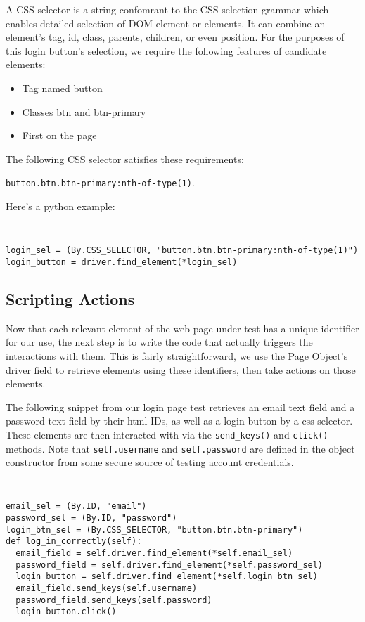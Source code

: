 A CSS selector is a string confomrant to the CSS selection grammar \citep{Selector54} which enables detailed selection of DOM element or elements. It can combine an element's tag, id, class, parents, children, or even position. For the purposes of this login button's selection, we require the following features of candidate elements:
\begin{itemize}
\item Tag named button
\item Classes btn and btn-primary
\item First on the page
\end{itemize}

The following CSS selector satisfies these requirements:

\texttt{button.btn.btn-primary:nth-of-type(1)}.

Here's a python example:
{\tt
\begin{verbatim}
login_sel = (By.CSS_SELECTOR, "button.btn.btn-primary:nth-of-type(1)")
login_button = driver.find_element(*login_sel)
\end{verbatim}
} \citep{gupta2003dom,DOMStand78, nicholus2016understanding}


\subsection{Scripting Actions}
Now that each relevant element of the web page under test has a unique identifier for our use, the next step is to write the code that actually triggers the interactions with them. This is fairly straightforward, we use the Page Object's driver field to retrieve elements using these identifiers, then take actions on those elements.

The following snippet from our login page test retrieves an email text field and a password text field by their html IDs, as well as a login button by a css selector. These elements are then interacted with via the \texttt{send\_keys()} and \texttt{click()} methods. Note that \texttt{self.username} and \texttt{self.password} are defined in the object constructor from some secure source of testing account credentials.

{\tt
\begin{verbatim}
email_sel = (By.ID, "email")
password_sel = (By.ID, "password")
login_btn_sel = (By.CSS_SELECTOR, "button.btn.btn-primary")
def log_in_correctly(self):
  email_field = self.driver.find_element(*self.email_sel)
  password_field = self.driver.find_element(*self.password_sel)
  login_button = self.driver.find_element(*self.login_btn_sel)
  email_field.send_keys(self.username)
  password_field.send_keys(self.password)
  login_button.click()
\end{verbatim}
}

